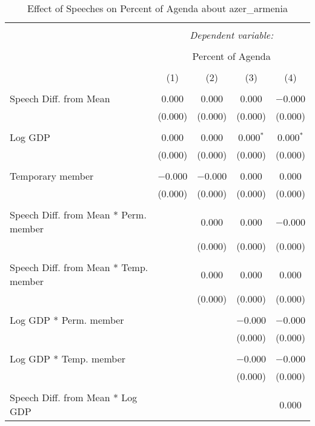
\begin{table}[!htbp] \centering 
  \caption{Effect of Speeches on Percent of Agenda about azer_armenia} 
  \label{} 
\begin{tabular}{@{\extracolsep{5pt}}lcccc} 
\\[-1.8ex]\hline 
\hline \\[-1.8ex] 
 & \multicolumn{4}{c}{\textit{Dependent variable:}} \\ 
\cline{2-5} 
\\[-1.8ex] & \multicolumn{4}{c}{Percent of Agenda} \\ 
\\[-1.8ex] & (1) & (2) & (3) & (4)\\ 
\hline \\[-1.8ex] 
 Speech Diff. from Mean & 0.000 & 0.000 & 0.000 & $-$0.000 \\ 
  & (0.000) & (0.000) & (0.000) & (0.000) \\ 
  & & & & \\ 
 Log GDP & 0.000 & 0.000 & 0.000$^{*}$ & 0.000$^{*}$ \\ 
  & (0.000) & (0.000) & (0.000) & (0.000) \\ 
  & & & & \\ 
 Temporary member & $-$0.000 & $-$0.000 & 0.000 & 0.000 \\ 
  & (0.000) & (0.000) & (0.000) & (0.000) \\ 
  & & & & \\ 
 Speech Diff. from Mean * Perm. member &  & 0.000 & 0.000 & $-$0.000 \\ 
  &  & (0.000) & (0.000) & (0.000) \\ 
  & & & & \\ 
 Speech Diff. from Mean * Temp. member &  & 0.000 & 0.000 & 0.000 \\ 
  &  & (0.000) & (0.000) & (0.000) \\ 
  & & & & \\ 
 Log GDP * Perm. member &  &  & $-$0.000 & $-$0.000 \\ 
  &  &  & (0.000) & (0.000) \\ 
  & & & & \\ 
 Log GDP * Temp. member &  &  & $-$0.000 & $-$0.000 \\ 
  &  &  & (0.000) & (0.000) \\ 
  & & & & \\ 
 Speech Diff. from Mean * Log GDP &  &  &  & 0.000 \\ 

\end{tabular}
\end{table}
